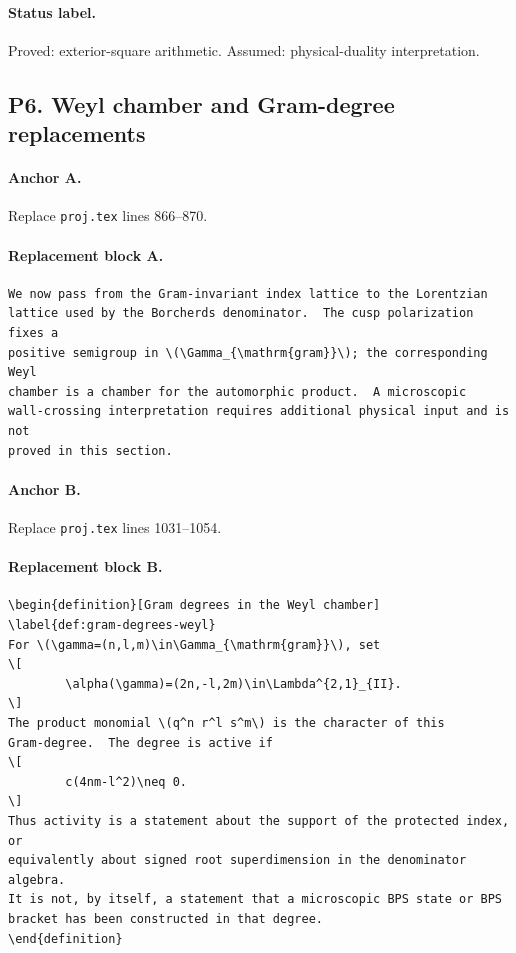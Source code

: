 \paragraph{Status label.}
Proved: exterior-square arithmetic.  Assumed: physical-duality
interpretation.

\subsection{P6. Weyl chamber and Gram-degree replacements}

\paragraph{Anchor A.}
Replace \texttt{proj.tex} lines 866--870.

\paragraph{Replacement block A.}
\begin{verbatim}
We now pass from the Gram-invariant index lattice to the Lorentzian
lattice used by the Borcherds denominator.  The cusp polarization fixes a
positive semigroup in \(\Gamma_{\mathrm{gram}}\); the corresponding Weyl
chamber is a chamber for the automorphic product.  A microscopic
wall-crossing interpretation requires additional physical input and is not
proved in this section.
\end{verbatim}

\paragraph{Anchor B.}
Replace \texttt{proj.tex} lines 1031--1054.

\paragraph{Replacement block B.}
\begin{verbatim}
\begin{definition}[Gram degrees in the Weyl chamber]
\label{def:gram-degrees-weyl}
For \(\gamma=(n,l,m)\in\Gamma_{\mathrm{gram}}\), set
\[
        \alpha(\gamma)=(2n,-l,2m)\in\Lambda^{2,1}_{II}.
\]
The product monomial \(q^n r^l s^m\) is the character of this
Gram-degree.  The degree is active if
\[
        c(4nm-l^2)\neq 0.
\]
Thus activity is a statement about the support of the protected index, or
equivalently about signed root superdimension in the denominator algebra.
It is not, by itself, a statement that a microscopic BPS state or BPS
bracket has been constructed in that degree.
\end{definition}
\end{verbatim}

